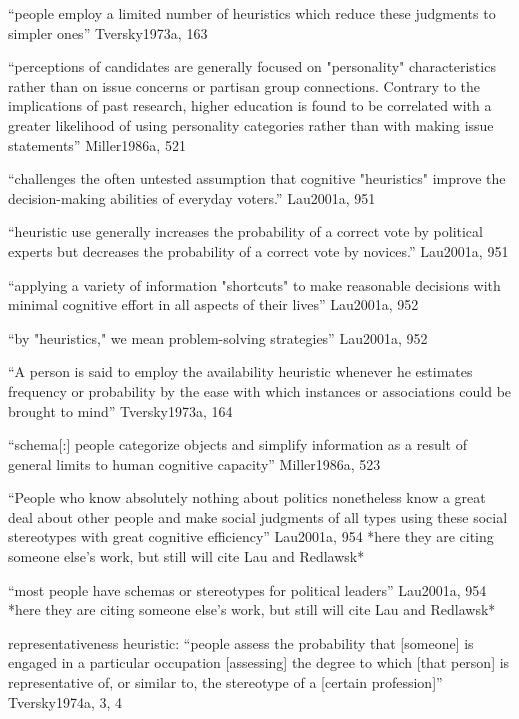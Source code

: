 		``people employ a limited number of heuristics which reduce these judgments to simpler ones'' Tversky1973a, 163

		``perceptions of candidates are generally focused on "personality" characteristics rather than on issue concerns or partisan group connections. Contrary to the implications of past research, higher education is found to be correlated with a greater likelihood of using personality categories rather than with making issue statements'' Miller1986a, 521

		``challenges the often untested assumption that cognitive "heuristics" improve the decision-making abilities of everyday voters.'' Lau2001a, 951

		``heuristic use generally increases the probability of a correct vote by political experts but decreases the probability of a correct vote by novices.'' Lau2001a, 951

		``applying a variety of information "shortcuts" to make reasonable decisions with minimal cognitive effort in all aspects of their lives'' Lau2001a, 952



		``by "heuristics," we mean problem-solving strategies'' Lau2001a, 952
	
		``A person is said to employ the availability heuristic whenever he estimates frequency or probability by the ease with which instances or associations could be brought to mind'' Tversky1973a, 164

		``schema[:] people categorize objects and simplify information as a result of general limits to human cognitive capacity'' Miller1986a, 523

	

		``People who know absolutely nothing about politics nonetheless know a great deal about other people and make social judgments of all types using these social stereotypes with great cognitive efficiency'' Lau2001a, 954 *here they are citing someone else's work, but still will cite Lau and Redlawsk*

		``most people have schemas or stereotypes for political leaders'' Lau2001a, 954 *here they are citing someone else's work, but still will cite Lau and Redlawsk*

		representativeness heuristic: ``people assess the probability that [someone] is engaged in a particular occupation [assessing] the degree to which [that person] is representative of, or similar to, the stereotype of a [certain profession]'' Tversky1974a, 3, 4


